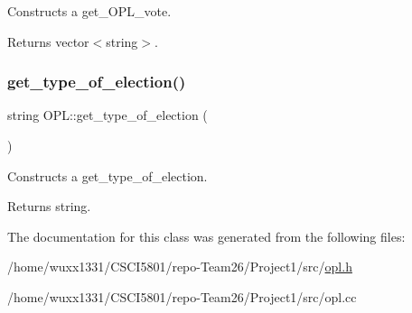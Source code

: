 Constructs a get\+\_\+\+O\+P\+L\+\_\+vote. 

\begin{DoxyReturn}{Returns}
vector$<$string$>$. 
\end{DoxyReturn}
\mbox{\label{classOPL_a3c3ffffffe20b1f68d45c6d9771229ba}} 
\subsubsection{\texorpdfstring{get\+\_\+type\+\_\+of\+\_\+election()}{get\_type\_of\_election()}}
{\footnotesize\ttfamily string O\+P\+L\+::get\+\_\+type\+\_\+of\+\_\+election (\begin{DoxyParamCaption}{ }\end{DoxyParamCaption})}



Constructs a get\+\_\+type\+\_\+of\+\_\+election. 

\begin{DoxyReturn}{Returns}
string. 
\end{DoxyReturn}


The documentation for this class was generated from the following files\+:\begin{DoxyCompactItemize}
\item 
/home/wuxx1331/\+C\+S\+C\+I5801/repo-\/\+Team26/\+Project1/src/\hyperlink{opl_8h}{opl.\+h}\item 
/home/wuxx1331/\+C\+S\+C\+I5801/repo-\/\+Team26/\+Project1/src/opl.\+cc\end{DoxyCompactItemize}
